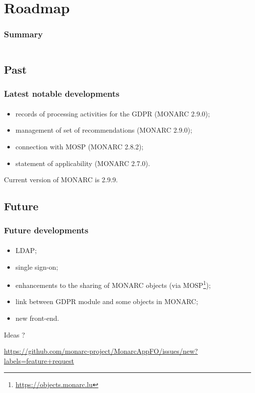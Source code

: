 %
%
\section{Roadmap}
\begin{frame}
    \frametitle{Summary}
    \begin{columns}[t]
        \begin{column}{5cm}
            \tableofcontents[sections={1-3}, currentsection, hideothersubsections]
        \end{column}
        \begin{column}{5cm}
            \tableofcontents[sections={4-6}, currentsection, hideothersubsections]
        \end{column}
    \end{columns}
\end{frame}

\subsection{Past}
\begin{frame}
    \frametitle{Latest notable developments}
    \framesubtitle{}
    \begin{itemize}
        \item records of processing activities for the GDPR (MONARC 2.9.0);
        \item management of set of recommendations (MONARC 2.9.0);
        \item connection with MOSP (MONARC 2.8.2);
        \item statement of applicability (MONARC 2.7.0).
    \end{itemize}
    \bigskip
    Current version of MONARC is 2.9.9.
\end{frame}

\subsection{Future}
\begin{frame}
    \frametitle{Future developments}
    \framesubtitle{}
    \begin{itemize}
        \item LDAP;
        \item single sign-on;
        \item enhancements to the sharing of MONARC objects (via MOSP\footnote{\url{https://objects.monarc.lu}});
        \item link between GDPR module and some objects in MONARC;
        \item new front-end.
    \end{itemize}
    \bigskip
    Ideas ?
    \bigskip

    \url{https://github.com/monarc-project/MonarcAppFO/issues/new?labels=feature+request}
\end{frame}
